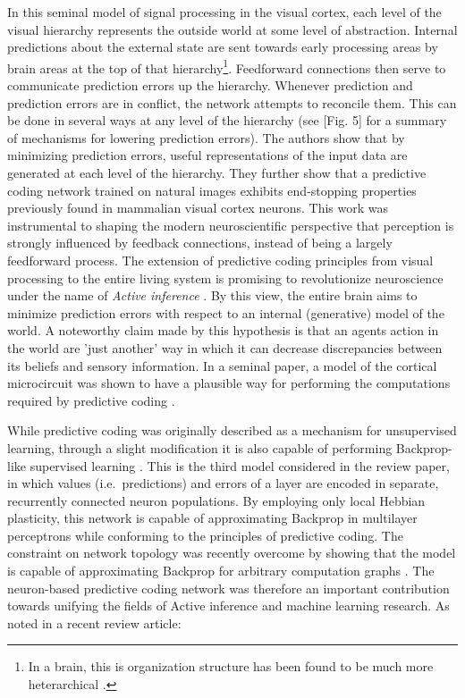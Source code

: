 In this seminal model of signal processing in the visual cortex, each level of the visual hierarchy represents the
outside world at some level of abstraction. Internal predictions about the external state are sent towards early
processing areas by brain areas at the top of that hierarchy\footnote{In a brain, this is organization structure has
been found to be much more heterarchical \citep{felleman1991distributed}.}. Feedforward connections then serve to
communicate prediction errors up the hierarchy. Whenever prediction and prediction errors are in conflict, the network
attempts to reconcile them. This can be done in several ways at any level of the hierarchy (see
\citep{kwisthout2017precise}[Fig. 5] for a summary of mechanisms for lowering prediction errors). The authors show that
by minimizing prediction errors, useful representations of the input data are generated at each level of the hierarchy.
They further show that a predictive coding network trained on natural images exhibits end-stopping properties previously
found in mammalian visual cortex neurons. This work was instrumental to shaping the modern neuroscientific perspective
that perception is strongly influenced by feedback connections, instead of being a largely feedforward process. The
extension of predictive coding principles from visual processing to the entire living system is promising to
revolutionize neuroscience under the name of \textit{Active inference} \citep{Friston2008,Friston2009,Adams2015}. By
this view, the entire brain aims to minimize prediction errors with respect to an internal (generative) model of the
world. A noteworthy claim made by this hypothesis is that an agents action in the world are 'just another' way
in which it can decrease discrepancies between its beliefs and sensory information. In a seminal paper, a model of the
cortical microcircuit \citep{haeusler2007statistical} was shown to have a plausible way for performing the computations
required by predictive coding \citep{bastos2012canonical}.

While predictive coding was originally described as a mechanism for unsupervised learning, through a slight modification
it is also capable of performing Backprop-like supervised learning \citep{Whittington2017}. This is the third model
considered in the review paper, in which values (i.e.\ predictions) and errors of a layer are encoded in separate,
recurrently connected neuron populations. By employing only local Hebbian plasticity, this network is capable of
approximating Backprop in multilayer perceptrons while conforming to the principles of predictive coding. The constraint
on network topology was recently overcome by showing that the model is capable of approximating Backprop for arbitrary
computation graphs \citep{Millidge2022}. The neuron-based predictive coding network was therefore an important
contribution towards unifying the fields of Active inference and machine learning research. As noted in a recent review
article:

